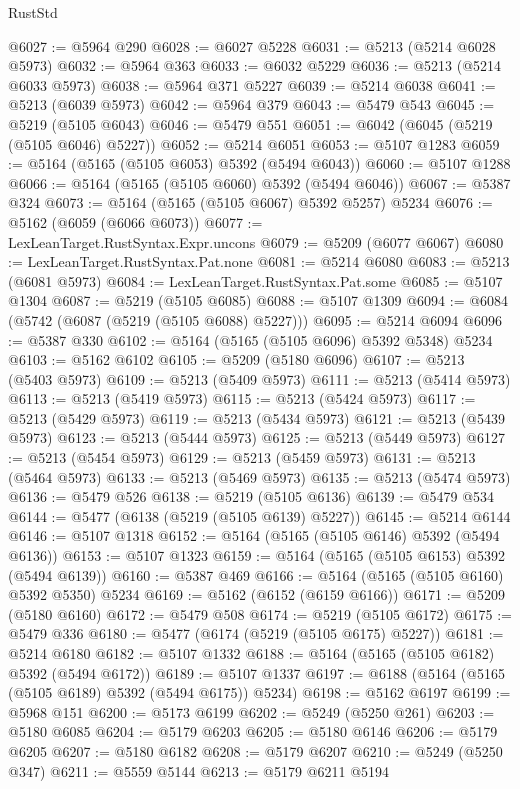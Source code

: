 \begin{lexlean}{RustStd}
\begin{coremodule}
@6027 := @5964 @290
@6028 := @6027 @5228
@6031 := @5213 (@5214 @6028 @5973)
@6032 := @5964 @363
@6033 := @6032 @5229
@6036 := @5213 (@5214 @6033 @5973)
@6038 := @5964 @371 @5227
@6039 := @5214 @6038
@6041 := @5213 (@6039 @5973)
@6042 := @5964 @379
@6043 := @5479 @543
@6045 := @5219 (@5105 @6043)
@6046 := @5479 @551
@6051 := @6042 (@6045 (@5219 (@5105 @6046) @5227))
@6052 := @5214 @6051
@6053 := @5107 @1283
@6059 := @5164 (@5165 (@5105 @6053) @5392 (@5494 @6043))
@6060 := @5107 @1288
@6066 := @5164 (@5165 (@5105 @6060) @5392 (@5494 @6046))
@6067 := @5387 @324
@6073 := @5164 (@5165 (@5105 @6067) @5392 @5257) @5234
@6076 := @5162 (@6059 (@6066 @6073))
@6077 := LexLeanTarget.RustSyntax.Expr.uncons
@6079 := @5209 (@6077 @6067)
@6080 := LexLeanTarget.RustSyntax.Pat.none
@6081 := @5214 @6080
@6083 := @5213 (@6081 @5973)
@6084 := LexLeanTarget.RustSyntax.Pat.some
@6085 := @5107 @1304
@6087 := @5219 (@5105 @6085)
@6088 := @5107 @1309
@6094 := @6084 (@5742 (@6087 (@5219 (@5105 @6088) @5227)))
@6095 := @5214 @6094
@6096 := @5387 @330
@6102 := @5164 (@5165 (@5105 @6096) @5392 @5348) @5234
@6103 := @5162 @6102
@6105 := @5209 (@5180 @6096)
@6107 := @5213 (@5403 @5973)
@6109 := @5213 (@5409 @5973)
@6111 := @5213 (@5414 @5973)
@6113 := @5213 (@5419 @5973)
@6115 := @5213 (@5424 @5973)
@6117 := @5213 (@5429 @5973)
@6119 := @5213 (@5434 @5973)
@6121 := @5213 (@5439 @5973)
@6123 := @5213 (@5444 @5973)
@6125 := @5213 (@5449 @5973)
@6127 := @5213 (@5454 @5973)
@6129 := @5213 (@5459 @5973)
@6131 := @5213 (@5464 @5973)
@6133 := @5213 (@5469 @5973)
@6135 := @5213 (@5474 @5973)
@6136 := @5479 @526
@6138 := @5219 (@5105 @6136)
@6139 := @5479 @534
@6144 := @5477 (@6138 (@5219 (@5105 @6139) @5227))
@6145 := @5214 @6144
@6146 := @5107 @1318
@6152 := @5164 (@5165 (@5105 @6146) @5392 (@5494 @6136))
@6153 := @5107 @1323
@6159 := @5164 (@5165 (@5105 @6153) @5392 (@5494 @6139))
@6160 := @5387 @469
@6166 := @5164 (@5165 (@5105 @6160) @5392 @5350) @5234
@6169 := @5162 (@6152 (@6159 @6166))
@6171 := @5209 (@5180 @6160)
@6172 := @5479 @508
@6174 := @5219 (@5105 @6172)
@6175 := @5479 @336
@6180 := @5477 (@6174 (@5219 (@5105 @6175) @5227))
@6181 := @5214 @6180
@6182 := @5107 @1332
@6188 := @5164 (@5165 (@5105 @6182) @5392 (@5494 @6172))
@6189 := @5107 @1337
@6197 := @6188 (@5164 (@5165 (@5105 @6189) @5392 (@5494 @6175)) @5234)
@6198 := @5162 @6197
@6199 := @5968 @151
@6200 := @5173 @6199
@6202 := @5249 (@5250 @261)
@6203 := @5180 @6085
@6204 := @5179 @6203
@6205 := @5180 @6146
@6206 := @5179 @6205
@6207 := @5180 @6182
@6208 := @5179 @6207
@6210 := @5249 (@5250 @347)
@6211 := @5559 @5144
@6213 := @5179 @6211 @5194

\end{coremodule}
\end{lexlean}
